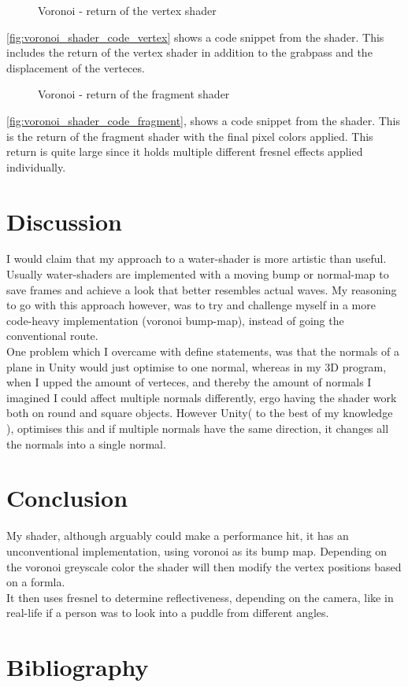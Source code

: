 \documentclass{article}
\begin{document}
\begin{figure}[H]
    \centering
    
    \caption{Voronoi - return of the vertex shader}
    \label{fig:voronoi_shader_code_vertex}
\end{figure}
\autoref{fig:voronoi_shader_code_vertex} shows a code snippet from the shader. This includes the return of the vertex shader in addition to the grabpass and the displacement of the verteces.

\begin{figure}[H]
    \centering
    
    \caption{Voronoi - return of the fragment shader}
    \label{fig:voronoi_shader_code_fragment}
\end{figure}
\autoref{fig:voronoi_shader_code_fragment}, shows a code snippet from the shader. This is the return of the fragment shader with the final pixel colors applied. This return is quite large since it holds multiple different fresnel effects applied individually.

\section{Discussion}
\label{sec:discussion}
I would claim that my approach to a water-shader is more artistic than useful. Usually water-shaders are implemented with a moving bump or normal-map to save frames and achieve a look that better resembles actual waves. My reasoning to go with this approach however, was to try and challenge myself in a more code-heavy implementation (voronoi bump-map), instead of going the conventional route.\\

One problem which I overcame with define statements, was that the normals of a plane in Unity would just optimise to one normal, whereas in my 3D program, when I upped the amount of verteces, and thereby the amount of normals I imagined I could affect multiple normals differently, ergo having the shader work both on round and square objects. However Unity( to the best of my knowledge ), optimises this and if multiple normals have the same direction, it changes all the normals into a single normal.

\section{Conclusion}
\label{sec:conclusion}
My shader, although arguably could make a performance hit, it has an unconventional implementation, using voronoi as its bump map. Depending on the voronoi greyscale color the shader will then modify the vertex positions based on a formla.\\It then uses fresnel to determine reflectiveness, depending on the camera, like in real-life if a person was to look into a puddle from different angles.


\section{Bibliography}
\printbibliography
\end{document}
